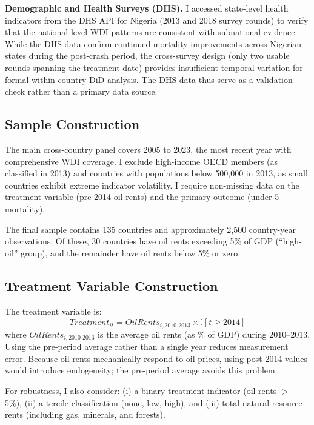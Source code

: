 \documentclass[12pt]{article}
\newcommand{\ind}{\mathbb{I}}
\begin{document}
\textbf{Demographic and Health Surveys (DHS).} I accessed state-level health indicators from the DHS API for Nigeria (2013 and 2018 survey rounds) to verify that the national-level WDI patterns are consistent with subnational evidence. While the DHS data confirm continued mortality improvements across Nigerian states during the post-crash period, the cross-survey design (only two usable rounds spanning the treatment date) provides insufficient temporal variation for formal within-country DiD analysis. The DHS data thus serve as a validation check rather than a primary data source.

\subsection{Sample Construction}

The main cross-country panel covers 2005 to 2023, the most recent year with comprehensive WDI coverage. I exclude high-income OECD members (as classified in 2013) and countries with populations below 500,000 in 2013, as small countries exhibit extreme indicator volatility. I require non-missing data on the treatment variable (pre-2014 oil rents) and the primary outcome (under-5 mortality).

The final sample contains 135 countries and approximately 2,500 country-year observations. Of these, 30 countries have oil rents exceeding 5\% of GDP (``high-oil'' group), and the remainder have oil rents below 5\% or zero.

\subsection{Treatment Variable Construction}

The treatment variable is:
\begin{equation}
Treatment_{it} = \overline{OilRents}_{i,2010\text{-}2013} \times \ind[t \geq 2014]
\end{equation}
where $\overline{OilRents}_{i,2010\text{-}2013}$ is the average oil rents (as \% of GDP) during 2010--2013. Using the pre-period average rather than a single year reduces measurement error. Because oil rents mechanically respond to oil prices, using post-2014 values would introduce endogeneity; the pre-period average avoids this problem.

For robustness, I also consider: (i) a binary treatment indicator (oil rents $>$ 5\%), (ii) a tercile classification (none, low, high), and (iii) total natural resource rents (including gas, minerals, and forests).
\end{document}
